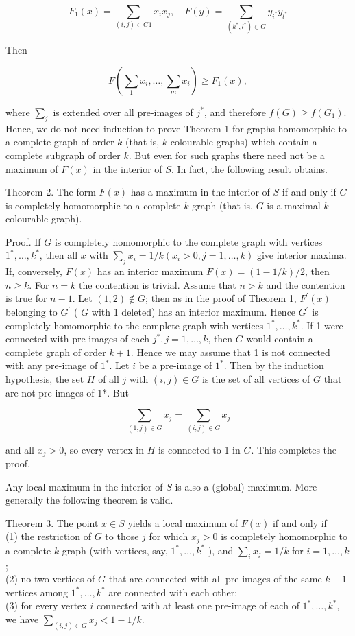 \documentclass[10pt]{article}
\begin{document}
\[
F_{1}(x)=\sum_{(i, j) \in G 1} x_{i} x_{j}, \quad F(y)=\sum_{\left(k^{*}, l^{*}\right) \in G} y_{i^{*}} y_{l^{*}}
\]

Then

\[
F\left(\sum_{1} x_{i}, \ldots, \sum_{m} x_{i}\right) \geqslant F_{1}(x),
\]

where \(\sum_{j}\) is extended over all pre-images of \(j^{*}\), and therefore \(f(G) \geqslant f\left(G_{1}\right)\). Hence, we do not need induction to prove Theorem 1 for graphs homomorphic to a complete graph of order \(k\) (that is, \(k\)-colourable graphs) which contain a complete subgraph of order \(k\). But even for such graphs there need not be a maximum of \(F(x)\) in the interior of \(S\). In fact, the following result obtains.

Theorem 2. The form \(F(x)\) has a maximum in the interior of \(S\) if and only if \(G\) is completely homomorphic to a complete \(k\)-graph (that is, \(G\) is a maximal \(k\)-colourable graph).

Proof. If \(G\) is completely homomorphic to the complete graph with vertices \(1^{*}, \ldots, k^{*}\), then all \(x\) with \(\sum_{j} x_{i}=1 / k\left(x_{i}>0, j=1, \ldots, k\right)\) give interior maxima. If, conversely, \(F(x)\) has an interior maximum \(F(x)=(1-1 / k) / 2\), then \(n \geqslant k\). For \(n=k\) the contention is trivial. Assume that \(n>k\) and the contention is true for \(n-1\). Let \((1,2) \notin G\); then as in the proof of Theorem 1, \(F^{\prime}(x)\) belonging to \(G^{\prime}\) ( \(G\) with 1 deleted) has an interior maximum. Hence \(G^{\prime}\) is completely homomorphic to the complete graph with vertices \(1^{*}, \ldots, k^{*}\). If 1 were connected with pre-images of each \(j^{*}, j=1, \ldots, k\), then \(G\) would contain a complete graph of order \(k+1\). Hence we may assume that 1 is not connected with any pre-image of \(1^{*}\). Let \(i\) be a pre-image of \(1^{*}\). Then by the induction hypothesis, the set \(H\) of all \(j\) with \((i, j) \in G\) is the set of all vertices of \(G\) that are not pre-images of 1*. But

\[
\sum_{(1, j) \in G} x_{j}=\sum_{(i, j) \in G} x_{j}
\]

and all \(x_{j}>0\), so every vertex in \(H\) is connected to 1 in \(G\). This completes the proof.

Any local maximum in the interior of \(S\) is also a (global) maximum. More generally the following theorem is valid.

Theorem 3. The point \(x \in S\) yields a local maximum of \(F(x)\) if and only if\\
(1) the restriction of \(G\) to those \(j\) for which \(x_{j}>0\) is completely homomorphic to a complete \(k\)-graph (with vertices, say, \(1^{*}, \ldots, k^{*}\) ), and \(\sum_{i} x_{j}=1 / k\) for \(i=1, \ldots, k\);\\
(2) no two vertices of \(G\) that are connected with all pre-images of the same \(k-1\) vertices among \(1^{*}, \ldots, k^{*}\) are connected with each other;\\
(3) for every vertex \(i\) connected with at least one pre-image of each of \(1^{*}, \ldots, k^{*}\), we have \(\sum_{(i, j) \in G} x_{j}<1-1 / k\).
\end{document}
